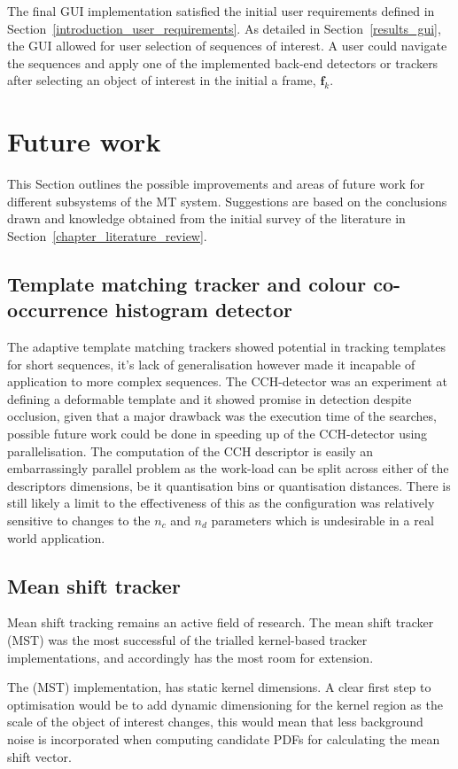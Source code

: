The final GUI implementation satisfied the initial user requirements defined in
Section~\ref{introduction_user_requirements}. As detailed in
Section~\ref{results_gui}, the GUI allowed for user selection of sequences of
interest. A user could navigate the sequences and apply one of the implemented
back-end detectors or trackers after selecting an object of interest in the
initial a frame, $\mathbf{f}_k$.


\section{Future work}\label{future}
This Section outlines the possible improvements and areas
of future work for different subsystems of the MT system. Suggestions are based
on the conclusions drawn and knowledge obtained from the initial survey of the
literature in Section~\ref{chapter_literature_review}.

\subsection{Template matching tracker and colour co-occurrence histogram
detector}
The adaptive template matching trackers showed potential in tracking templates for
short sequences, it's lack of generalisation however made it incapable of
application to more complex sequences. 
The CCH-detector was an experiment at defining a deformable template
and it showed promise in detection despite occlusion, given that a major
drawback was the execution time of the searches, possible future work could be
done in speeding up of the CCH-detector using parallelisation. The computation
of the CCH descriptor is easily an embarrassingly parallel problem as the
work-load can be split across either of the descriptors dimensions, be it
quantisation bins or quantisation distances. 
There is still likely a limit to the effectiveness of this as the configuration
was relatively sensitive to changes to the $n_c$ and $n_d$ parameters which is
undesirable in a real world application.

\subsection{Mean shift tracker}
Mean shift tracking remains an active field of research. The mean shift tracker
(MST) was the most successful of the trialled kernel-based tracker implementations, and
accordingly has the most room for extension.

The (MST) implementation, has static kernel dimensions. A clear first
step to optimisation would be to add dynamic dimensioning for the kernel region
as the scale of the object of interest changes, this would mean that less
background noise is incorporated when computing candidate PDFs for calculating
the mean shift vector.

